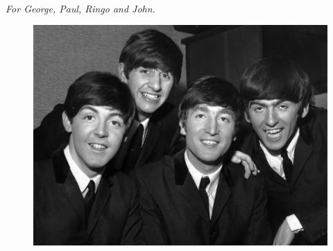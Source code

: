 

\blanknonumber\ \blanknonumber

\vspace*{\fill}

\begin{center}\emph{
%
For George, Paul, Ringo and John.
%
}
\end{center}

\begin{figure}[h!]
    \centering
    \includegraphics[scale=0.18]{imgs/the-beatles.png}
\end{figure}


\vfill\vfill\vfill
